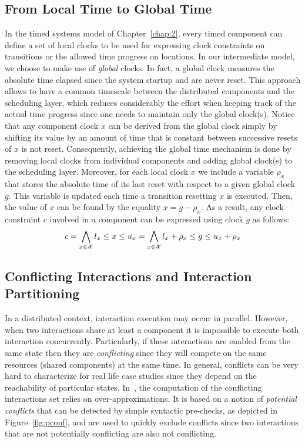 \subsection{From Local Time to Global Time}
In the timed systems model of Chapter~\ref{chap:2}, every timed component can define a set of 
local clocks to be used for expressing clock constraints on transitions or the allowed time 
progress on locations. In our intermediate model, we choose to make use of \emph{global} clocks.
In fact, a global clock measures the absolute time elapsed since the system startup and are never
reset. This approach allows to have a common timescale between the distributed components
and the scheduling layer, which reduces considerably the effort when keeping track of the
actual time progress since one needs to maintain only the global clock(s). 
Notice that any component clock $x$ can be derived from the global clock simply by shifting its 
value by an amount of time that is constant between successive resets of $x$ is not reset. 
Consequently, achieving 
the global time mechanism is done by removing local clocks from individual components 
and adding global clock(s) to the scheduling layer. Moreover, for each local clock $x$
we include a variable $\rho_x$ that stores the absolute time of its last reset with respect
to a given global clock $g$. This variable is updated each time a transition resetting $x$ 
is executed. Then, the value of $x$ can be found by the equality $x=g-\rho_x$.  
As a result, any clock constraint $c$ involved in a component can be expressed using clock $g$
as follows:
\begin{equation}\label{eq:g_clk}
  c=\bigwedge_{x\in\mathcal{X}} l_x\le x\le u_x=\bigwedge_{x\in\mathcal{X}}l_x+\rho_x\le g\le u_x+\rho_x
\end{equation}

\subsection{Conflicting Interactions and Interaction Partitioning}
\label{sub:conf}
In a distributed context, interaction execution may occur in parallel. However,
when two interactions share at least a component it is impossible to execute both
interaction concurrently. Particularly, if these interactions are enabled from the same state 
then they are \emph{conflicting} since they will compete on the same resources (shared 
components) at the same time.
In general, conflicts can be very hard to characterize for real life case studies since 
they depend on the reachability of particular states. In~\cite{}, the computation of
the conflicting interactions set relies on over-approximations. It is based on a notion 
of \emph{potential conflicts} that can be detected by simple syntactic pre-checks, as depicted
in Figure~\ref{fig:pconf}, and are used to quickly exclude conflicts since two interactions
that are not potentially conflicting are also not conflicting. 

